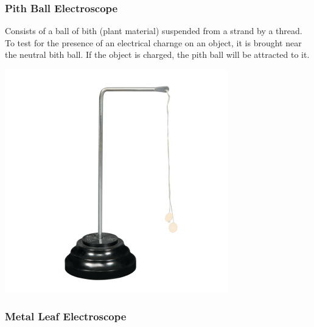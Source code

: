 \documentclass{article}
\begin{document}
    \subsubsection*{Pith Ball Electroscope}
        Consists of a ball of bith (plant material) suspended from a strand by a thread. To test for the presence of an electrical charnge on an object, it is brought near the neutral bith ball. If the object is charged, the pith ball will be attracted to it.\\
        \begin{center}
            \includegraphics[scale = 0.3]{pithball electroscope}
        \end{center}

    \subsubsection*{Metal Leaf Electroscope}
\end{document}
